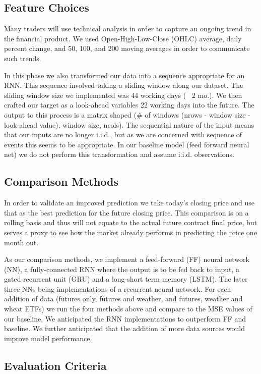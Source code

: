 \documentclass[twoside,11pt]{article}
\begin{document}
\subsection{Feature Choices}

Many traders will use technical analysis in order to capture an ongoing trend in the financial product. We used Open-High-Low-Close (OHLC) average, daily percent change, and 50, 100, and 200 moving averages in order to communicate such trends.  

In this phase we also transformed our data into a sequence appropriate for an RNN. This sequence involved taking a sliding window along our dataset. The sliding window size we implemented was 44 working days (~ 2 mo.). We then crafted our target as a look-ahead variables 22 working days into the future. The output to this process is a matrix shaped (\# of windows (nrows - window size - look-ahead value), window size, ncols). The sequential nature of the input means that our inputs are no longer i.i.d., but as we are concerned with sequence of events this seems to be appropriate. In our baseline model (feed forward neural net) we do not perform this transformation and assume i.i.d. observations. 

\subsection{Comparison Methods}

In order to validate an improved prediction we take today's closing price and use that as the best prediction for the future closing price. This comparison is on a rolling basis and thus will not equate to the actual future contract final price, but serves a proxy to see how the market already performs  in predicting the price one month out. 

As our comparison methods, we implement a feed-forward (FF) neural network (NN), a fully-connected RNN where the output is to be fed back to input, a gated recurrent unit (GRU) and a long-short term memory (LSTM). The later three NNs being implementations of a recurrent neural network. For each addition of data (futures only, futures and weather, and futures, weather and wheat ETFs) we run the four methods above and compare to the MSE values of our baseline. We anticipated the RNN implementations to outperform FF and baseline. We further anticipated that the addition of more data sources would improve model performance. 

\subsection{Evaluation Criteria}
\end{document}
